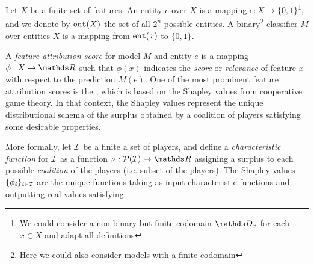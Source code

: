 Let $X$ be a finite set of features. An entity $e$ over $X$ is a mapping $e: X \to \{0,1\}$\footnote{We could consider a non-binary but finite codomain $\domain_x$ for each $x \in X$ and adapt all definitions}, and we denote by $\texttt{ent}(X)$ the set of all $2^n$ possible entities. A binary\footnote{Here we could also consider models with a finite codomain} classifier $M$ over entities $X$ is a mapping from $\texttt{ent}(x)$ to $\{0,1\}$.

A \textit{feature attribution score} for model $M$ and entity $e$ is a mapping $\phi : X \to \R$ such that $\phi(x)$ indicates the \textit{score} or \textit{relevance} of feature $x$ with respect to the prediction $M(e)$. One of the most prominent feature attribution scores is the \SHAPscore{} \cite{lundberg2017unified}, which is based on the Shapley values \cite{shapley1953value} from cooperative game theory. In that context, the Shapley values represent the unique distributional schema of the surplus obtained by a coalition of players satisfying some desirable properties.

More formally, let $\mathcal{I}$ be a finite a set of players, and define a \textit{characteristic function} for $\mathcal{I}$ as a function $\charactheristicFunction : \mathcal{P}(\players) \to \R$ assigning a surplus to each possible \textit{coalition} of the players (i.e. subset of the players). The Shapley values $\{\phi_i\}_{i \in \mathcal{I}}$ are the unique functions taking as input characteristic functions and outputting real values satisfying

